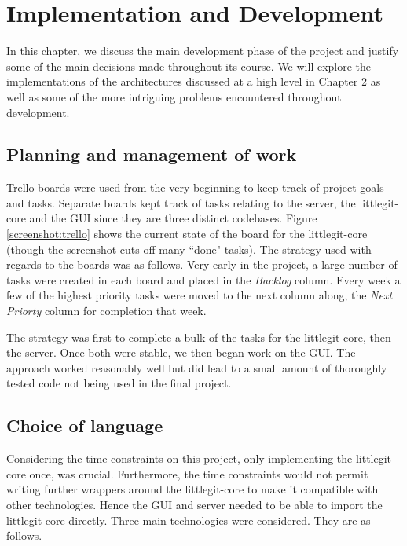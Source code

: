 \chapter{Implementation and Development}

In this chapter, we discuss the main development phase of the project and justify some of the main decisions made throughout its course. We will explore the implementations of the architectures discussed at a high level in Chapter 2 as well as some of the more intriguing problems encountered throughout development.


\section{Planning and management of work}

Trello boards were used from the very beginning to keep track of project goals and tasks. Separate boards kept track of tasks relating to the server, the littlegit-core and the GUI since they are three distinct codebases. Figure \ref{screenshot:trello} shows the current state of the board for the littlegit-core (though the screenshot cuts off many ``done" tasks). The strategy used with regards to the boards was as follows. Very early in the project, a large number of tasks were created in each board and placed in the \emph{Backlog} column. Every week a few of the highest priority tasks were moved to the next column along, the \emph{Next Priorty} column for completion that week. 


The strategy was first to complete a bulk of the tasks for the littlegit-core, then the server. Once both were stable, we then began work on the GUI. The approach worked reasonably well but did lead to a small amount of thoroughly tested code not being used in the final project.

\section{Choice of language}

Considering the time constraints on this project, only implementing the littlegit-core once, was crucial. Furthermore, the time constraints would not permit writing further wrappers around the littlegit-core to make it compatible with other technologies. Hence the GUI and server needed to be able to import the littlegit-core directly. Three main technologies were considered. They are as follows.

